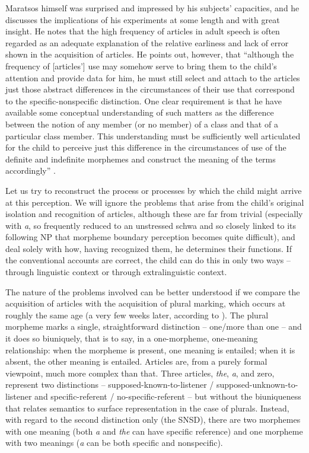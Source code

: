 Maratsos himself was surprised and impressed by his subjects' capacities, and he discusses the implications of his experiments at
some length and with great insight. He notes that the high frequency of articles in adult speech is often regarded as an adequate explanation of the relative earliness and lack of error shown in the acquisition of articles. He points out, however, that ``although the frequency of [articles'] use may somehow serve to bring them to the child's atten\-tion and provide data for him, he must still select and attach to the articles just those abstract differences in the circumstances of their use that correspond to the specific-nonspecific distinction. One clear requirement is that he have available some conceptual understanding of such matters as the difference between the notion of any member (or no member) of a class and that of a particular class member. This understanding must be sufficiently well articulated for the child to perceive just this difference in the circumstances of use of the definite and indefinite morphemes and construct the meaning of the terms accordingly'' \citep[453]{Maratsos1974}.

Let us try to reconstruct the process or processes by which the child might arrive at this perception. We will ignore the problems that arise from the child's original isolation and recognition of articles, although these are far from trivial (especially with \textit{a}, so frequently reduced to an unstressed schwa and so closely linked to its following NP that morpheme boundary perception becomes quite difficult), and deal solely with how, having recognized them, he determines their functions. If the conventional accounts are correct, the child can do this in only two ways -- through linguistic context or through extralinguistic context.

The nature of the problems involved can be better understood if we compare the acquisition of articles with the acquisition of plural marking, which occurs at roughly the same age (a very few weeks later, according to \citealt{Brown1973}). The plural morpheme marks a single, straightforward distinction -- one/more than one -- and it does so biuniquely, that is to say, in a one-morpheme, one-meaning relationship: when the morpheme is present, one meaning is entailed; when it is absent, the other meaning is entailed. Articles are, from a purely formal viewpoint, much more complex than that. Three articles, \textit{the}, \textit{a}, and
zero, represent two distinctions -- supposed-known-to-listener / supposed-unknown-to-listener and specific-referent / no-specific-referent -- but without the biuniqueness that relates semantics to surface repre\-sentation in the case of plurals. Instead, with regard to the second distinction only (the SNSD), there are two morphemes with one meaning (both \textit{a} and \textit{the} can have specific reference) and one mor\-pheme with two meanings (\textit{a} can be both specific and nonspecific).

